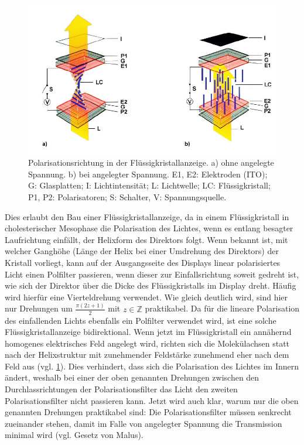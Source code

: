 \documentclass[
	a4paper,
	12pt,
	pagesize,
	ngerman
]{scrartcl}
\begin{document}
	\begin{figure}[H]
			\includegraphics[width=1\linewidth]{img/displayHelix}
			\caption{
			Polarisationsrichtung in der Flüssigkristallanzeige. a) ohne angelegte Spannung. b) bei angelegter Spannung. E1, E2: Elektroden (ITO); G: Glasplatten; I: Lichtintensität; L: Lichtwelle; LC: Flüssigkristall;
P1, P2: Polarisatoren; S: Schalter, V: Spannungsquelle. \cite{displayHelix}
			}
			\label{fig_displayHelixBild}
	\end{figure}

	Dies erlaubt den Bau einer Flüssigkristallanzeige, da in einem Flüssigkristall in cholesterischer Mesophase die Polarisation des Lichtes, wenn es entlang besagter Laufrichtung einfällt, der Helixform des Direktors folgt.
	Wenn bekannt ist, mit welcher Ganghöhe (Länge der Helix bei einer Umdrehung des Direktors) der Kristall vorliegt, kann auf der Ausgangsseite des Displays linear polarisiertes Licht einen Polfilter passieren, wenn dieser zur Einfallsrichtung soweit gedreht ist, wie sich der Direktor über die Dicke des Flüssigkristalls im Display dreht.
	Häufig wird hierfür eine Vierteldrehung verwendet. Wie gleich deutlich wird, sind hier nur Drehungen um $\frac{\pi (2z+1)}{2}$ mit $z \in \mathbb{Z}$ praktikabel.
	Da für die lineare Polarisation des einfallenden Lichts ebenfalls ein Polfilter verwendet wird, ist eine solche Flüssigkristallanzeige bidirektional.
	Wenn jetzt im Flüssigkristall ein annähernd homogenes elektrisches Feld angelegt wird, richten sich die Molekülachsen statt nach der Helixstruktur mit zunehmender Feldstärke zunehmend eher nach dem Feld aus (vgl. \cref{fig_displayHelixBild}). %
	Dies verhindert, dass sich die Polarisation des Lichtes im Innern ändert, weshalb bei einer der oben genannten Drehungen zwischen den Durchlassrichtungen der Polarisationsfilter das Licht den zweiten Polarisationsfilter nicht passieren kann.
	Jetzt wird auch klar, warum nur die oben genannten Drehungen praktikabel sind:
	Die Polarisationsfilter müssen senkrecht zueinander stehen, damit im Falle von angelegter Spannung die Transmission minimal wird (vgl. Gesetz von Malus).
\end{document}
